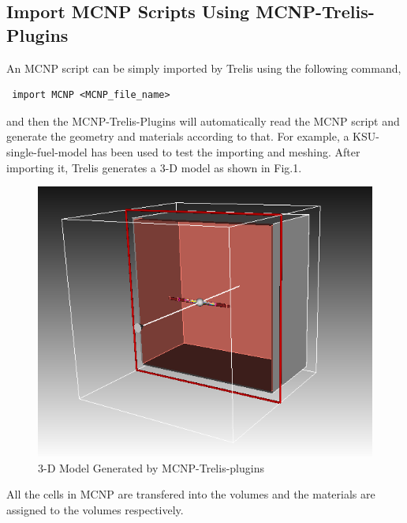 \documentclass[a4paper]{article}
\begin{document}
\subsection{Import MCNP Scripts Using MCNP-Trelis-Plugins}
An MCNP script can be simply imported by Trelis using the following command,
\begin{lstlisting}
 import MCNP <MCNP_file_name>
\end{lstlisting}
and then the MCNP-Trelis-Plugins will automatically read the MCNP script and generate the geometry and materials according to that. For example, a KSU-single-fuel-model has been
used to test the importing and meshing. After importing it, Trelis generates a 3-D model as shown in Fig.1. 
\begin{figure}[th!]
\centering
\includegraphics[width=.6\textwidth]{fig1}
\caption{3-D Model Generated by MCNP-Trelis-plugins}
\end{figure}
All the cells in MCNP are transfered into the volumes and the materials are assigned to the volumes respectively.
\end{document}
